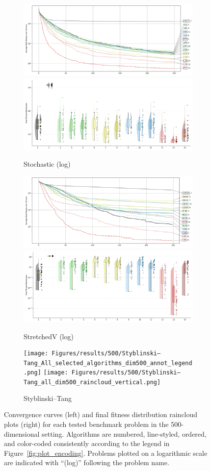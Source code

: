 \begin{figure}[p]
\begin{subfigure}{1\textwidth}
    \centering
    \includegraphics[width=.49\textwidth]{Figures/results/500/Stochastic_All_selected_algorithms_dim500_annot_legend.png}
    \includegraphics[width=.49\textwidth]{Figures/results/500/Stochastic_all_dim500_raincloud_vertical.png}
    \caption{Stochastic (log)}
\end{subfigure}

\begin{subfigure}{1\textwidth}
    \centering
    \includegraphics[width=.49\textwidth]{Figures/results/500/StretchedV_All_selected_algorithms_dim500_annot_legend.png}
    \includegraphics[width=.49\textwidth]{Figures/results/500/StretchedV_all_dim500_raincloud_vertical.png}
    \caption{StretchedV (log)}
\end{subfigure}

\begin{subfigure}{1\textwidth}
    \centering
    \texttt{[image: Figures/results/500/Styblinski–Tang\_All\_selected\_algorithms\_dim500\_annot\_legend.png]}
    \texttt{[image: Figures/results/500/Styblinski–Tang\_all\_dim500\_raincloud\_vertical.png]}
    \caption{Styblinski–Tang}
\end{subfigure}



\caption[Convergence curves and final fitness distribution raincloud plots for\\500-dimensional problems]{Convergence curves (left) and final fitness distribution raincloud plots (right) for each tested benchmark problem in the 500-dimensional setting. Algorithms are numbered, line-styled, ordered, and color-coded consistently according to the legend in Figure~\ref{fig:plot_encoding}. Problems plotted on a logarithmic scale are indicated with ``(log)'' following the problem name.}
\label{fig:results500}
\end{figure}


